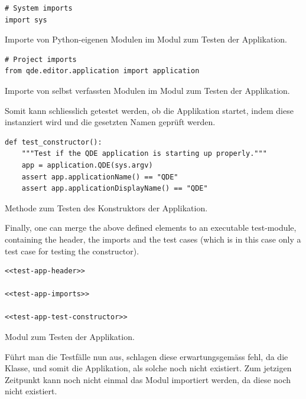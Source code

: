 \documentclass[10pt, openright, notitlepage]{scrreprt}
\begin{document}
\begin{listing}[H]
\begin{verbatim}
# System imports
import sys
\end{verbatim}
\caption{Importe von Python-eigenen Modulen im Modul zum Testen der Applikation.}
\end{listing}

\begin{listing}[H]
\begin{verbatim}
# Project imports
from qde.editor.application import application
\end{verbatim}
\caption{\label{test-app-project-imports}
Importe von selbst verfassten Modulen im Modul zum Testen der Applikation.}
\end{listing}

Somit kann schliesslich getestet werden, ob die Applikation startet, indem diese
instanziert wird und die gesetzten Namen geprüft werden.

\begin{listing}[H]
\begin{verbatim}
def test_constructor():
    """Test if the QDE application is starting up properly."""
    app = application.QDE(sys.argv)
    assert app.applicationName() == "QDE"
    assert app.applicationDisplayName() == "QDE"
\end{verbatim}
\caption{\label{test-app-test-constructor}
Methode zum Testen des Konstruktors der Applikation.}
\end{listing}

Finally, one can merge the above defined elements to an executable test-module,
containing the header, the imports and the test cases (which is in this case
only a test case for testing the constructor).

\begin{listing}[H]
\begin{verbatim}
<<test-app-header>>

<<test-app-imports>>

<<test-app-test-constructor>>
\end{verbatim}
\caption{Modul zum Testen der Applikation.}
\end{listing}

Führt man die Testfälle nun aus, schlagen diese erwartungsgemäss fehl, da die
Klasse, und somit die Applikation, als solche noch nicht existiert. Zum jetzigen
Zeitpunkt kann noch nicht einmal das Modul importiert werden, da diese noch
nicht existiert.
\end{document}
